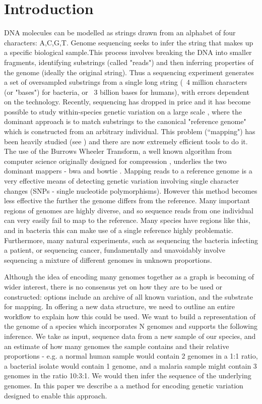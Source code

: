 \documentclass[runningheads,a4paper]{llncs}
\begin{document}
\section{Introduction}

DNA molecules can be modelled as strings drawn from an alphabet of four characters: A,C,G,T. Genome sequencing seeks to infer the string that makes up a specific biological sample.This process involves breaking the DNA into smaller fragments, identifying substrings (called "reads") and then inferring properties of the genome (ideally the original string). Thus a sequencing experiment generates a set of oversampled substrings from a single long string (~4 million characters (or "bases") for bacteria, or ~3 billion bases for humans), with errors dependent on the technology. Recently, sequencing has dropped in price and it has become possible to study within-species genetic variation on a large scale \cite{1000g,arabi,pombe}, where the dominant approach is to match substrings to the canonical "reference genome" which is constructed from an arbitrary individual.  This problem (``mapping") has been heavily studied  (see \cite{reinert}) and there are now extremely efficient tools to do it. The use of the Burrows Wheeler Transform, a well known algorithm from computer science originally designed for compression  \cite{bwt}, underlies the two dominant mappers - bwa \cite{bwa} and bowtie \cite{bowtie}. Mapping reads to a reference genome is a very effective means of detecting genetic variation involving single character changes (SNPs - single nucleotide polymorphisms). However this method becomes less effective the further the genome differs from the reference.  Many important regions of genomes are highly diverse, and so sequence reads from one individual can very easily fail to map to the reference. Many species have  regions like this, and in bacteria this can make use of a single reference highly problematic. Furthermore, many natural experiments, such as sequencing the bacteria infecting a patient,  or sequencing cancer,  fundamentally and unavoidably involve sequencing a mixture of different genomes in unknown proportions. 

Although the idea of encoding many genomes together as a graph is becoming of wider interest, there is no consensus yet on how they are to be used or constructed: options include an archive of all known variation, and the substrate for mapping. In offering a new data structure, we need to outline an entire workflow to explain how this could be used. We want to build a representation of the genome of a species which incorporates N genomes and supports the following inference. We take as input, sequence data from a new sample of our species, and  an estimate of how many genomes the sample contains and their relative proportions - e.g. a normal human sample would contain 2 genomes in a 1:1 ratio, a bacterial isolate would contain 1 genome, and a malaria sample might contain 3 genomes in the ratio 10:3:1. We would then infer the sequence of the underlying genomes. In this paper we describe a a method for encoding genetic variation designed to enable this approach. 
\end{document}
